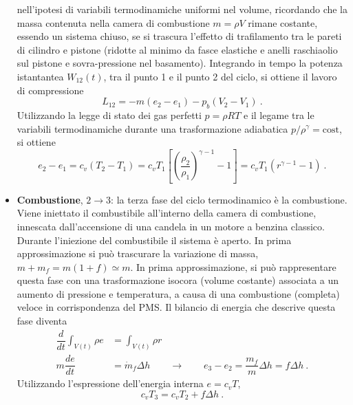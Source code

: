 \begin{itemize}
\begin{equation}
\end{equation}
nell'ipotesi di variabili termodinamiche uniformi nel volume, ricordando che la massa contenuta nella camera di combustione $m = \rho V$ rimane costante, essendo un sistema chiuso, se si trascura l'effetto di trafilamento tra le pareti di cilindro e pistone (ridotte al minimo da fasce elastiche e anelli raschiaolio sul pistone e sovra-pressione nel basamento).
\newline \noindent
Integrando in tempo la potenza istantantea $W_{12}(t)$, tra il punto 1 e il punto 2 del ciclo, si ottiene il lavoro di compressione
\begin{equation}
 L_{12} = - m (e_2 - e_1) - p_b ( V_2 - V_1 ) \ .
\end{equation}
Utilizzando la legge di stato dei gas perfetti $p = \rho R T$ e il legame tra le variabili termodinamiche durante una trasformazione adiabatica $p/\rho^\gamma = \text{cost}$, si ottiene
\begin{equation}
 e_2 - e_1 = c_v ( T_2 - T_1 ) = c_v T_1 \left[ \left( \dfrac{\rho_2}{\rho_1} \right)^{\gamma-1} - 1 \right] = c_v T_1 \left( r^{\gamma-1} - 1\right) \ .
\end{equation}

\item \textbf{Combustione}, $2 \rightarrow 3$: la terza fase del ciclo termodinamico è la combustione. Viene iniettato il combustibile all'interno della camera di combustione, innescata dall'accensione di una candela in un motore a benzina classico. Durante l'iniezione del combustibile il sistema è aperto. In prima approssimazione si può trascurare la variazione di massa, $m + m_f = m ( 1 + f ) \simeq m$. In prima approssimazione, si può rappresentare questa fase con una trasformazione isocora (volume costante) associata a un aumento di pressione e temperatura, a causa di una combustione (completa) veloce in corrispondenza del PMS. Il bilancio di energia che descrive questa fase diventa
\begin{equation}
\begin{aligned}
 \dfrac{d}{dt} \displaystyle\int_{V(t)} \rho e & = \int_{V(t)} \rho r \\
 m \dfrac{d e}{d t} & = \dot{m}_f \Delta h \qquad \rightarrow \qquad
 e_3 - e_2 = \dfrac{ m_f }{ m } \Delta h  = f \Delta h \ .
\end{aligned}
\end{equation}
Utilizzando l'espressione dell'energia interna $e = c_v T$,
\begin{equation}
 c_v T_3 = c_v T_2 + f \Delta h \ .
\end{equation}


\end{itemize}
